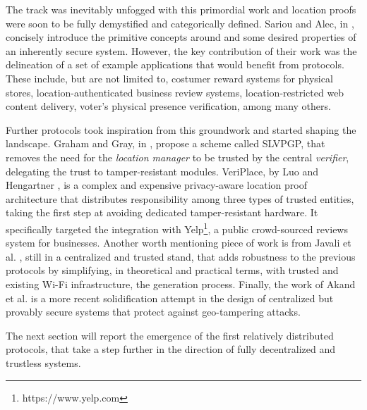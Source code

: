 The \pol{} track was inevitably unfogged with this primordial work and location proofs were soon to be fully demystified and categorically defined. Sariou and Alec, in \cite{saroiu2009enabling}, concisely introduce the primitive concepts around \pol{} and some desired properties of an inherently secure system. However, the key contribution of their work was the delineation of a set of example applications that would benefit from \pol{} protocols. These include, but are not limited to, costumer reward systems for physical stores, location-authenticated business review systems, location-restricted web content delivery, voter's physical presence verification, among many others.

Further protocols took inspiration from this groundwork and started shaping the landscape. Graham and Gray, in \cite{graham2009protecting}, propose a \pol{} scheme called SLVPGP, that removes the need for the \emph{location manager} to be trusted by the central \emph{verifier}, delegating the trust to tamper-resistant modules. VeriPlace, by Luo and Hengartner \cite{luo2010veriplace}, is a complex and expensive privacy-aware location proof architecture that distributes responsibility among three types of trusted entities, taking the first step at avoiding dedicated tamper-resistant hardware. It specifically targeted the integration with Yelp\footnote{https://www.yelp.com}, a public crowd-sourced reviews system for businesses. Another worth mentioning piece of work is from Javali et al. \cite{javali2016alice}, still in a centralized and trusted stand, that adds robustness to the previous protocols by simplifying, in theoretical and practical terms, with trusted and existing Wi-Fi infrastructure, the \pol{} generation process. Finally, the work of Akand et al. \cite{akand2021privacy} is a more recent solidification attempt in the design of centralized but provably secure \pol{} systems that protect against geo-tampering attacks.

The next section will report the emergence of the first relatively distributed \pol{} protocols, that take a step further in the direction of fully decentralized and trustless systems.